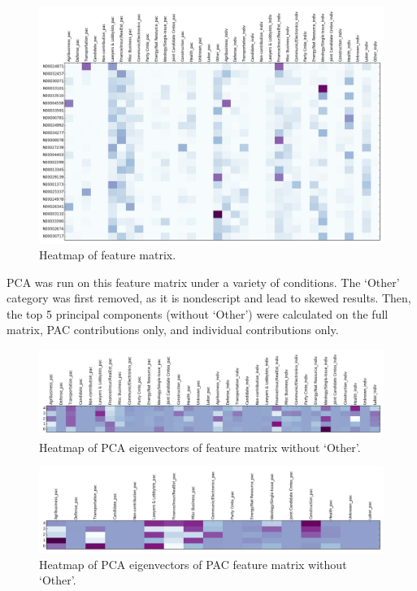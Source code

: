 \documentclass[10]{article}
\begin{document}
\begin{figure}[H]
\centering
\includegraphics[width=.9\textwidth]{../../data/features/visualize/features.png}
\caption{\label{fig:fmtrx}Heatmap of feature matrix.}
\end{figure}
PCA was run on this feature matrix under a variety of conditions.  The `Other' category was first removed, as it is nondescript and lead to skewed results.  Then, the top 5 principal components  (without `Other') were calculated on the full matrix, PAC contributions only, and individual contributions only.
\begin{figure}[H]
\centering
\includegraphics[width=.9\textwidth]{../../data/features/visualize/pcs_no_other.png}
\caption{\label{fig:pc_all}Heatmap of PCA eigenvectors of feature matrix without `Other'.}
\end{figure}
\begin{figure}[H]
\centering
\includegraphics[width=.9\textwidth]{../../data/features/visualize/pcs_no_other_pac.png}
\caption{\label{fig:pc_all}Heatmap of PCA eigenvectors of PAC feature matrix without `Other'.}
\end{figure}
\end{document}
